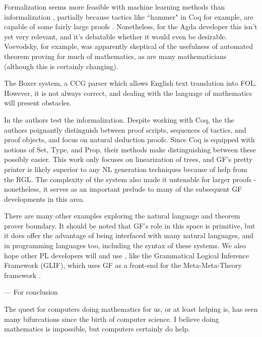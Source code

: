Formalization seems more feasible with machine learning methods than
informalization , partially because tactics like ``hammer" in Coq for example,
are capable of some fairly large proofs \cite{czajka2018hammer} . Nonetheless,
for the Agda developer this isn't yet very relevant, and it's debatable whether
it would even be desirable. Voevodsky, for example, was apparently skeptical of
the usefulness of automated theorem proving for much of mathematics, as are many
mathematicians (although this is certainly changing).

The Boxer system, a CCG parser \cite{bos-etal-2004-wide} which allows English
text translation into FOL. However, it is not always correct, and dealing with
the language of mathematics will present obstacles. 

In \cite{proofFrom} the authors test the informalization. Despite working with
Coq, the the authors poignantly distinguish between proof scripts, sequences of
tactics, and proof objects, and focus on natural deduction proofs. Since Coq is
equipped with notions of Set, Type, and Prop, their methods make distinguishing
between these possibly easier. This work only focuses on linearization of trees,
and GF's pretty printer is likely superior to any NL generation techniques
because of help from the RGL. The complexity of the system also made it
untenable for larger proofs - nonetheless, it serves as an important prelude to
many of the subsequent GF developments in this area.

There are many other examples exploring the natural language and theorem prover
boundary. It should be noted that GF's role in this space is primitive, but it
does offer the advantage of being interfaced with many natural languages, and in
programming languages too, including the syntax of these systems. We also hope
other PL developers will and use , like the Grammatical Logical Inference
Framework (GLIF), which uses GF as a front-end for the Meta-Meta-Theory
framework \cite{schaefer2020glif}.





--- For conclusion



The quest for computers doing mathematics for us, or at least helping is, has
seen many bifurcations since the birth of computer science. I believe doing
mathematics is impossible, but computers certainly do help.